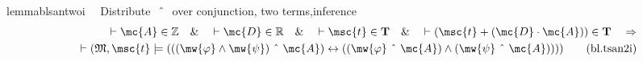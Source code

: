 \begin{restatable}{lemma}{blsantwoi}~~ Distribute $~\string^~$ over conjunction,
two terms,inference
\begin{align}
\vdash \mc{A} \in \mathbb{Z}\quad\&\quad \vdash \mc{D} \in
    \mathbb{R}\quad\&\quad \vdash \msc{t} \in \mathbf{T}\quad\&\quad \vdash (
    \msc{t} + ( \mc{D} \cdot \mc{A} ) ) \in \mathbf{T}\quad\Rightarrow \notag \\ 
	\quad
    \vdash ( \mathfrak{M} , \msc{t} \models ( ( ( \mw{\varphi} \wedge \mw{\psi}
    ) ~\string^~ \mc{A} ) \leftrightarrow ( ( \mw{\varphi} ~\string^~ \mc{A} )
    \wedge ( \mw{\psi} ~\string^~ \mc{A} ) ) )
    )\label{eq:bl.tsan2i}\tag{bl.tsan2i}
\end{align}
\end{restatable}

